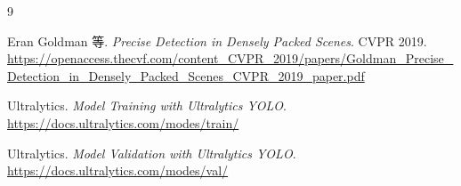 \documentclass[12pt,a4paper]{ctexart}
\begin{document}
\begin{thebibliography}{9}

Eran Goldman 等. \textit{Precise Detection in Densely Packed Scenes}. CVPR 2019. \\[2pt]
\url{https://openaccess.thecvf.com/content_CVPR_2019/papers/Goldman_Precise_Detection_in_Densely_Packed_Scenes_CVPR_2019_paper.pdf}

Ultralytics. \textit{Model Training with Ultralytics YOLO}. \\[2pt]
\url{https://docs.ultralytics.com/modes/train/}

Ultralytics. \textit{Model Validation with Ultralytics YOLO}. \\[2pt]
\url{https://docs.ultralytics.com/modes/val/}

\end{thebibliography}
\end{document}
